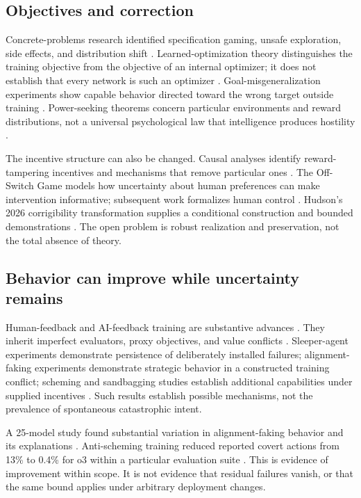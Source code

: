 \documentclass[10pt,twocolumn,letterpaper]{article}
\begin{document}
\subsection{Objectives and correction}
Concrete-problems research identified specification gaming, unsafe exploration, side effects, and distribution shift \cite{concrete}. Learned-optimization theory distinguishes the training objective from the objective of an internal optimizer; it does not establish that every network is such an optimizer \cite{mesa}. Goal-misgeneralization experiments show capable behavior directed toward the wrong target outside training \cite{goal}. Power-seeking theorems concern particular environments and reward distributions, not a universal psychological law that intelligence produces hostility \cite{power}.

The incentive structure can also be changed. Causal analyses identify reward-tampering incentives and mechanisms that remove particular ones \cite{reward}. The Off-Switch Game models how uncertainty about human preferences can make intervention informative; subsequent work formalizes human control \cite{offswitch,humancontrol}. Hudson's 2026 corrigibility transformation supplies a conditional construction and bounded demonstrations \cite{hudson}. The open problem is robust realization and preservation, not the total absence of theory.

\subsection{Behavior can improve while uncertainty remains}
Human-feedback and AI-feedback training are substantive advances \cite{rlhf,cai}. They inherit imperfect evaluators, proxy objectives, and value conflicts \cite{rlhflimits}. Sleeper-agent experiments demonstrate persistence of deliberately installed failures; alignment-faking experiments demonstrate strategic behavior in a constructed training conflict; scheming and sandbagging studies establish additional capabilities under supplied incentives \cite{sleeper,faking,scheming,sandbag}. Such results establish possible mechanisms, not the prevalence of spontaneous catastrophic intent.

A 25-model study found substantial variation in alignment-faking behavior and its explanations \cite{variation}. Anti-scheming training reduced reported covert actions from 13\% to 0.4\% for o3 within a particular evaluation suite \cite{antischeming}. This is evidence of improvement within scope. It is not evidence that residual failures vanish, or that the same bound applies under arbitrary deployment changes.
\end{document}
